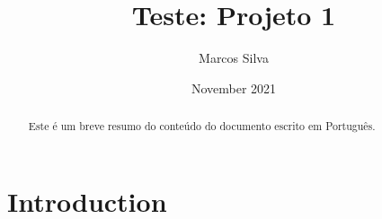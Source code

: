 \documentclass{article}
\title{Teste: Projeto 1}
\author{Marcos Silva}
\date{November 2021}
\begin{document}
\maketitle

\vspace{2cm}

\begin{abstract}
Este é um breve resumo do conteúdo do documento escrito em Português.
\end{abstract}

\section{Introduction}
\end{document}
